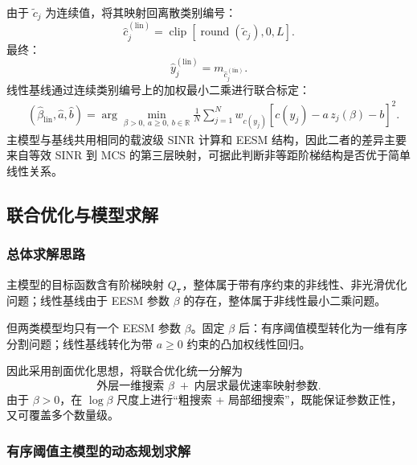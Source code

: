\documentclass[bwprint]{gmcmthesis}
\numberwithin{figure}{section}
\begin{document}
由于 $\widetilde c_j$ 为连续值，将其映射回离散类别编号：
\begin{equation}
	\widehat c_j^{(\mathrm{lin})}
	=
	\operatorname{clip}\left[\operatorname{round}\left(\widetilde c_j\right),0,L\right].
\end{equation}
最终：
\begin{equation}
	\boxed{
	\widehat y_j^{(\mathrm{lin})}=m_{\widehat c_j^{(\mathrm{lin})}}.
	}
	\label{eq:linear-final}
\end{equation}
线性基线通过连续类别编号上的加权最小二乘进行联合标定：
\begin{equation}
	\boxed{
	\begin{aligned}
	&\left(\widehat\beta_{\mathrm{lin}},\widehat a,\widehat b\right)
	=
	\arg\min_{\beta>0,\ a\ge0,\ b\in\mathbb{R}}
	\frac{1}{N}\sum_{j=1}^{N}
	w_{c(y_j)}
	\left[
	c(y_j)-a\,z_j(\beta)-b
	\right]^2.
	\end{aligned}
	}
	\label{eq:joint-lin}
\end{equation}
主模型与基线共用相同的载波级 SINR 计算和 EESM 结构，因此二者的差异主要来自等效 SINR 到 MCS 的第三层映射，可据此判断非等距阶梯结构是否优于简单线性关系。

\subsection{联合优化与模型求解}

\subsubsection{总体求解思路}

主模型的目标函数含有阶梯映射 $Q_{\boldsymbol{\tau}}$，整体属于带有序约束的非线性、非光滑优化问题；线性基线由于 EESM 参数 $\beta$ 的存在，整体属于非线性最小二乘问题。

但两类模型均只有一个 EESM 参数 $\beta$。固定 $\beta$ 后：有序阈值模型转化为一维有序分割问题；线性基线转化为带 $a\ge0$ 约束的凸加权线性回归。

因此采用剖面优化思想，将联合优化统一分解为
\begin{equation}
	\boxed{
	\text{外层一维搜索 }\beta
	\;+\;
	\text{内层求最优速率映射参数}.
	}
	\label{eq:profile}
\end{equation}
由于 $\beta>0$，在 $\log\beta$ 尺度上进行``粗搜索 + 局部细搜索''，既能保证参数正性，又可覆盖多个数量级。

\subsubsection{有序阈值主模型的动态规划求解}
\end{document}
